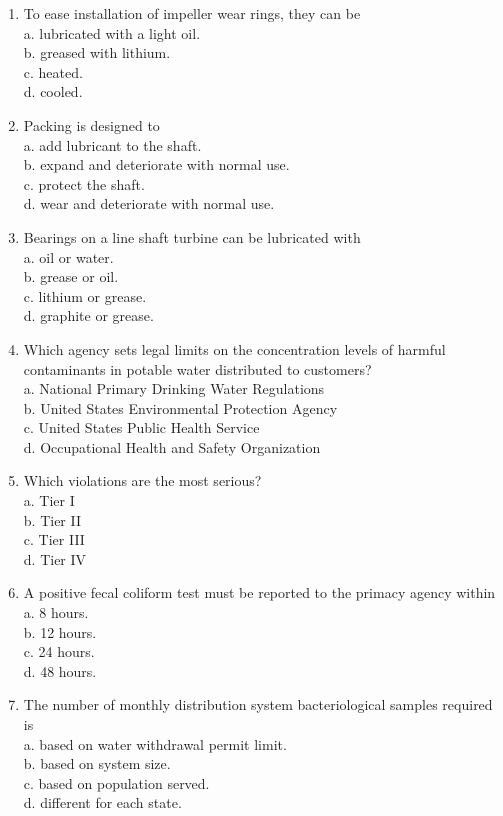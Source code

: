 \documentclass[10pt]{article}
\begin{document}
\begin{enumerate}
  \item To ease installation of impeller wear rings, they can be\\
a. lubricated with a light oil.\\
b. greased with lithium.\\
c. heated.\\
d. cooled.

  \item Packing is designed to\\
a. add lubricant to the shaft.\\
b. expand and deteriorate with normal use.\\
c. protect the shaft.\\
d. wear and deteriorate with normal use.

  \item Bearings on a line shaft turbine can be lubricated with\\
a. oil or water.\\
b. grease or oil.\\
c. lithium or grease.\\
d. graphite or grease.

  \item Which agency sets legal limits on the concentration levels of harmful contaminants in potable water distributed to customers?\\
a. National Primary Drinking Water Regulations\\
b. United States Environmental Protection Agency\\
c. United States Public Health Service\\
d. Occupational Health and Safety Organization

  \item Which violations are the most serious?\\
a. Tier I\\
b. Tier II\\
c. Tier III\\
d. Tier IV

  \item A positive fecal coliform test must be reported to the primacy agency within\\
a. 8 hours.\\
b. 12 hours.\\
c. 24 hours.\\
d. 48 hours.

  \item The number of monthly distribution system bacteriological samples required is\\
a. based on water withdrawal permit limit.\\
b. based on system size.\\
c. based on population served.\\
d. different for each state.


\end{enumerate}
\end{document}
